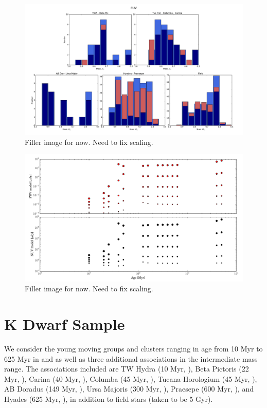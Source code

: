 \documentclass[twocolumn]{aastex62}
\begin{document}
\begin{figure}[h]
\centering
\includegraphics[width=.9\linewidth]{massdistributions_fuv.pdf}
\caption{Filler image for now. Need to fix scaling. \label{fig:massdistributions_fuv}}
\end{figure}

\begin{figure}[th]
\centering
\includegraphics[width=0.8\linewidth]{mfd_vs_age.pdf}
\caption{Filler image for now. Need to fix scaling. \label{fig:mvd_vs_age}}
\end{figure}



\section{K Dwarf Sample}\label{sec:sample}





We consider the young moving groups and clusters ranging in age from 10 Myr to 625 Myr in \citet{Shkolnik2014} and \citet{Schneider2018} as well as three additional associations in the intermediate mass range. The associations included are TW Hydra (10 Myr, \citealt{Bell2015}), Beta Pictoris (22 Myr, \citealt{Shkolnik2017}), Carina (40 Myr, \citealt{Torres2008}), Columba (45 Myr, \citealt{Zuckerman2011}), Tucana-Horologium (45 Myr, \citealt{Bell2015}), AB Doradus (149 Myr, \citealt{Bell2015}), Ursa Majoris (300 Myr, \citealt{King2005}), Praesepe (600 Myr, \citealt{Kraus2007}), and Hyades (625 Myr, \citealt{Perryman1997}), in addition to field stars (taken to be 5 Gyr).
\end{document}
